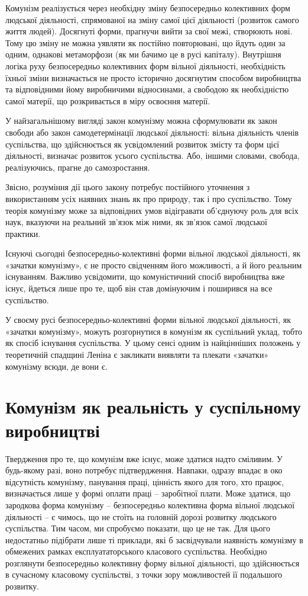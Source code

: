 \documentclass[12pt,a4paper,openany]{book}
\begin{document}
Комунізм реалізується через необхідну зміну безпосередньо колективних форм людської діяльності, спрямованої на зміну самої цієї діяльності (розвиток самого життя людей). Досягнуті форми, прагнучи вийти за свої межі, створюють нові. Тому цю зміну не можна уявляти як постійно повторювані, що йдуть один за одним, однакові метаморфози (як ми бачимо це в русі капіталу). Внутрішня логіка руху безпосередньо колективних форм вільної діяльності, необхідність їхньої зміни визначається не просто історично досягнутим способом виробництва та відповідними йому виробничими відносинами, а свободою як необхідністю самої матерії, що розкривається в міру освоєння матерії.

У найзагальнішому вигляді закон комунізму можна сформулювати як закон свободи або закон самодетермінації людської діяльності: вільна діяльність членів суспільства, що здійснюється як усвідомлений розвиток змісту та форм цієї діяльності, визначає розвиток усього суспільства. Або, іншими словами, свобода, реалізуючись, прагне до самозростання.

Звісно, розуміння дії цього закону потребує постійного уточнення з використанням усіх наявних знань як про природу, так і про суспільство. Тому теорія комунізму може за відповідних умов відігравати об’єднуючу роль для всіх наук, вказуючи на реальний зв’язок між ними, як зв’язок самої людської практики.

Існуючі сьогодні безпосередньо-колективні форми вільної людської діяльності, як «зачатки комунізму», є не просто свідченням його можливості, а й його реальним існуванням. Важливо усвідомити, що комуністичний спосіб виробництва вже існує, йдеться лише про те, щоб він став домінуючим і поширився на все суспільство.

У своєму русі безпосередньо-колективні форми вільної людської діяльності, як «зачатки комунізму», можуть розгорнутися в комунізм як суспільний уклад, тобто як спосіб існування суспільства. У цьому сенсі одним із найцінніших положень у теоретичній спадщині Леніна є закликати виявляти та плекати «зачатки» комунізму всюди, де вони є.
\ifSubfilesClassLoaded{\setcounter{page}{19}}{}
\section{Комунізм як реальність у суспільному виробництві}
\label{sec:04_kommunizm_realnost}

Твердження про те, що комунізм вже існує, може здатися надто сміливим. У будь-якому разі, воно потребує підтвердження. Навпаки, одразу впадає в око відсутність комунізму, панування праці, цінність якого для того, хто працює, визначається лише у формі оплати праці – заробітної плати. Може здатися, що зародкова форма комунізму – безпосередньо колективна форма вільної людської діяльності – є чимось, що не стоїть на головній дорозі розвитку людського суспільства. Тим часом, ми спробуємо показати, що це не так. Для цього недостатньо підібрати лише ті приклади, які б засвідчували наявність комунізму в обмежених рамках експлуататорського класового суспільства. Необхідно розглянути безпосередньо колективну форму вільної діяльності, що здійснюється в сучасному класовому суспільстві, з точки зору можливостей її подальшого розвитку.
\end{document}
